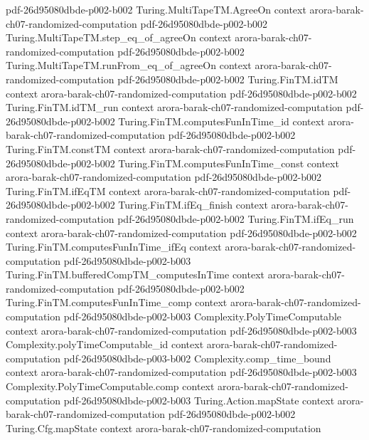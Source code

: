\begin{theorem}
  {pdf-26d95080dbde-p002-b002}
\proofstep
  {Turing.MultiTapeTM.AgreeOn}
  {context}
  {arora-barak-ch07-randomized-computation}
  {pdf-26d95080dbde-p002-b002}
\proofstep
  {Turing.MultiTapeTM.step_eq_of_agreeOn}
  {context}
  {arora-barak-ch07-randomized-computation}
  {pdf-26d95080dbde-p002-b002}
\proofstep
  {Turing.MultiTapeTM.runFrom_eq_of_agreeOn}
  {context}
  {arora-barak-ch07-randomized-computation}
  {pdf-26d95080dbde-p002-b002}
\proofstep
  {Turing.FinTM.idTM}
  {context}
  {arora-barak-ch07-randomized-computation}
  {pdf-26d95080dbde-p002-b002}
\proofstep
  {Turing.FinTM.idTM_run}
  {context}
  {arora-barak-ch07-randomized-computation}
  {pdf-26d95080dbde-p002-b002}
\proofstep
  {Turing.FinTM.computesFunInTime_id}
  {context}
  {arora-barak-ch07-randomized-computation}
  {pdf-26d95080dbde-p002-b002}
\proofstep
  {Turing.FinTM.constTM}
  {context}
  {arora-barak-ch07-randomized-computation}
  {pdf-26d95080dbde-p002-b002}
\proofstep
  {Turing.FinTM.computesFunInTime_const}
  {context}
  {arora-barak-ch07-randomized-computation}
  {pdf-26d95080dbde-p002-b002}
\proofstep
  {Turing.FinTM.ifEqTM}
  {context}
  {arora-barak-ch07-randomized-computation}
  {pdf-26d95080dbde-p002-b002}
\proofstep
  {Turing.FinTM.ifEq_finish}
  {context}
  {arora-barak-ch07-randomized-computation}
  {pdf-26d95080dbde-p002-b002}
\proofstep
  {Turing.FinTM.ifEq_run}
  {context}
  {arora-barak-ch07-randomized-computation}
  {pdf-26d95080dbde-p002-b002}
\proofstep
  {Turing.FinTM.computesFunInTime_ifEq}
  {context}
  {arora-barak-ch07-randomized-computation}
  {pdf-26d95080dbde-p002-b003}
\proofstep
  {Turing.FinTM.bufferedCompTM_computesInTime}
  {context}
  {arora-barak-ch07-randomized-computation}
  {pdf-26d95080dbde-p002-b002}
\proofstep
  {Turing.FinTM.computesFunInTime_comp}
  {context}
  {arora-barak-ch07-randomized-computation}
  {pdf-26d95080dbde-p002-b003}
\proofstep
  {Complexity.PolyTimeComputable}
  {context}
  {arora-barak-ch07-randomized-computation}
  {pdf-26d95080dbde-p002-b003}
\proofstep
  {Complexity.polyTimeComputable_id}
  {context}
  {arora-barak-ch07-randomized-computation}
  {pdf-26d95080dbde-p003-b002}
\proofstep
  {Complexity.comp_time_bound}
  {context}
  {arora-barak-ch07-randomized-computation}
  {pdf-26d95080dbde-p002-b003}
\proofstep
  {Complexity.PolyTimeComputable.comp}
  {context}
  {arora-barak-ch07-randomized-computation}
  {pdf-26d95080dbde-p002-b003}
\proofstep
  {Turing.Action.mapState}
  {context}
  {arora-barak-ch07-randomized-computation}
  {pdf-26d95080dbde-p002-b002}
\proofstep
  {Turing.Cfg.mapState}
  {context}
  {arora-barak-ch07-randomized-computation}

\end{theorem}
